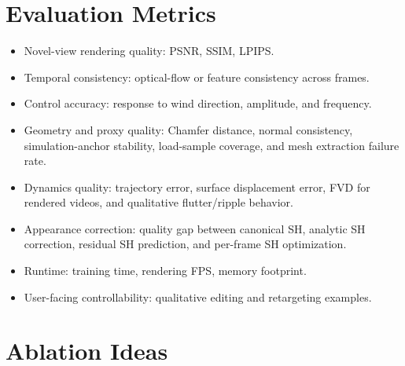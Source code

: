 \documentclass[11pt]{article}
\begin{document}
\section{Evaluation Metrics}

\begin{itemize}
  \item Novel-view rendering quality: PSNR, SSIM, LPIPS.
  \item Temporal consistency: optical-flow or feature consistency across frames.
  \item Control accuracy: response to wind direction, amplitude, and frequency.
  \item Geometry and proxy quality: Chamfer distance, normal consistency, simulation-anchor stability, load-sample coverage, and mesh extraction failure rate.
  \item Dynamics quality: trajectory error, surface displacement error, FVD for rendered videos, and qualitative flutter/ripple behavior.
  \item Appearance correction: quality gap between canonical SH, analytic SH correction, residual SH prediction, and per-frame SH optimization.
  \item Runtime: training time, rendering FPS, memory footprint.
  \item User-facing controllability: qualitative editing and retargeting examples.
\end{itemize}

\section{Ablation Ideas}
\end{document}
